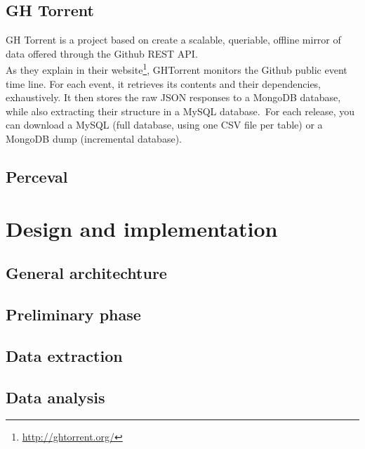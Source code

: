 \documentclass[a4paper, 12pt]{book}
\begin{document}
\section{GH Torrent}
\label{sec:ghtorrent}
GH Torrent is a project based on create a scalable, queriable, offline mirror of data offered through the Github REST API.\\
As they explain in their website\footnote{\url{http://ghtorrent.org/}}, GHTorrent monitors the Github public event time line. For each event, it retrieves its contents and their dependencies, exhaustively. It then stores the raw JSON responses to a MongoDB database, while also extracting their structure in a MySQL database.\
For each release, you can download a MySQL (full database, using one CSV file per table) or a MongoDB dump (incremental database).\\


\section{Perceval}
\label{sec:perceval}



\cleardoublepage
\chapter{Design and implementation}

\section{General architechture}
\label{sec:arquitectura}

\section{Preliminary phase}
\label{sec:fase-preliminar}

\section{Data extraction}
\label{sec:extraccion-datos}

\section{Data analysis}
\label{sec:analisis-datos}
\end{document}
